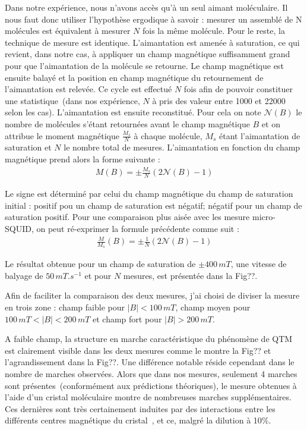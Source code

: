 Dans notre expérience, nous n'avons accès qu'à un seul aimant moléculaire. Il nous faut donc utiliser l'hypothèse ergodique à savoir : mesurer un assemblé de N molécules est équivalent à mesurer $N$ fois la même molécule. Pour le reste, la technique de mesure est identique. L'aimantation est amenée à saturation, ce qui revient, dans notre cas, à appliquer un champ magnétique suffisamment grand pour que l'aimantation de la molécule se retourne. Le champ magnétique est ensuite balayé et la position en champ magnétique du retournement de l'aimantation est relevée. Ce cycle est effectué $N$ fois afin de pouvoir constituer une statistique~(dans nos expérience, $N$ à pris des valeur entre 1000 et 22000 selon les cas). L'aimantation est ensuite reconstitué. Pour cela on note $\mathscr{N}(B)$ le nombre de molécules s'étant retournées avant le champ magnétique $B$ et on attribue le moment magnétique $\frac{M_s}{N}$ à chaque molécule, $M_s$ étant l'aimantation de saturation et $N$ le nombre total de mesures. L'aimantation en fonction du champ magnétique prend alors la forme suivante :
\begin{eqnarray}
M(B) =\pm \frac{M_s}{N}(2\mathscr{N}(B) -1)\nonumber
\end{eqnarray}

Le signe est déterminé par celui du champ magnétique du champ de saturation initial : positif pou un champ de saturation est négatif; négatif pour un champ de saturation positif. Pour une comparaison plus aisée avec les mesure micro-SQUID, on peut ré-exprimer la formule précédente comme suit :
\begin{eqnarray}
\frac{M}{M_s}(B) =\pm \frac{1}{N} (2\mathscr{N}(B) -1)
\end{eqnarray}

Le résultat obtenue pour un champ de saturation de $\pm 400 \, mT$, une vitesse de balyage de $50\,mT.s^{-1}$ et pour $N$ mesures, est présentée dans la Fig??.

Afin de faciliter la comparaison des deux mesures, j'ai choisi de diviser la mesure en trois zone : champ faible pour $|B|< 100\,mT$, champ moyen pour $100\,mT<|B|< 200\,mT$ et champ fort pour $|B| > 200\,mT$.

A faible champ, la structure en marche caractéristique du phénomène de QTM~\cite{Thomas1996,Friedman1996} est clairement visible dans les deux mesures comme le montre la Fig?? et l'agrandissement dans la Fig??. Une différence notable réside cependant dans le nombre de marches observées. Alors que dans nos mesures, seulement 4 marches sont présentes~(conformément aux prédictions théoriques), le mesure obtenues à l'aide d'un cristal moléculaire montre de nombreuses marches supplémentaires. Ces dernières sont très certainement induites par des interactions entre les différents centres magnétique du cristal~\cite{Wernsdorfer2002}, et ce, malgré la dilution à 10\%.

